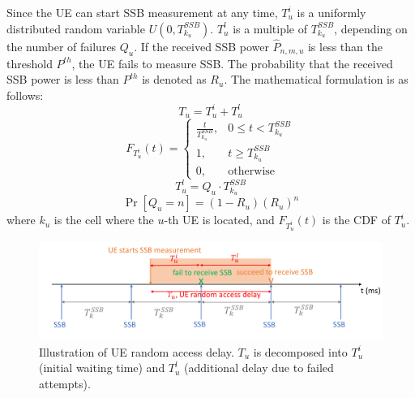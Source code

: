 Since the UE can start SSB measurement at any time, $T_u^i$ is a uniformly distributed random variable $U(0, T_{k_u}^{SSB})$. $T_u^l$ is a multiple of $T_{k_u}^{SSB}$, depending on the number of failures $Q_u$. If the received SSB power $\hat{P}_{n, m, u}$ is less than the threshold $P^{th}$, the UE fails to measure SSB. The probability that the received SSB power is less than $P^{th}$ is denoted as $R_u$. The mathematical formulation is as follows:
\begin{equation}
    T_u = T_u^i + T_u^l
\end{equation}
\begin{equation}
    F_{T_u^i}(t) =
    \begin{cases}
        \frac{t}{T_{k_u}^{SSB}}, & 0 \leq t < T_{k_u}^{SSB} \\
        1, & t \geq T_{k_u}^{SSB} \\
        0, & \text{otherwise}
    \end{cases}
\end{equation}
\begin{equation}
    T_u^l = Q_u \cdot T_{k_u}^{SSB}
\end{equation}
\begin{equation}
    \Pr\left[Q_u = n\right] = (1 - R_u) (R_u)^n
\end{equation}
where $k_u$ is the cell where the $u$-th UE is located, and $F_{T_u^i}(t)$ is the CDF of $T_u^i$.

\begin{figure}[h!]
    \centering
    \includegraphics[width=1\textwidth]{figure/random access delay.pdf}
    \caption{Illustration of UE random access delay. $T_u$ is decomposed into $T_u^i$ (initial waiting time) and $T_u^l$ (additional delay due to failed attempts).}
    \label{RAD}
\end{figure}

